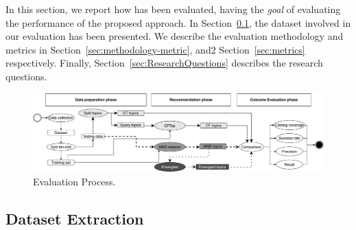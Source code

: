 





In this section, we report how \CT has been evaluated, having the {\em goal} of evaluating the performance of the proposed approach. In Section~\ref{sec:Dataset}, the dataset involved in our evaluation has been presented. We describe the evaluation methodology and metrics in Section~\ref{sec:methodology-metric}, and2 Section~\ref{sec:metrics} respectively. Finally, Section~\ref{sec:ResearchQuestions} describes the research questions.



\begin{figure}[h!]
	\centering
	\includegraphics[width=0.9\linewidth,keepaspectratio]{figs/evaluationCF.pdf}
	\caption{Evaluation Process.}
	\label{fig:EvaluationProcess}
	\vspace{-.3cm}
\end{figure}

\subsection{Dataset Extraction} \label{sec:Dataset}



